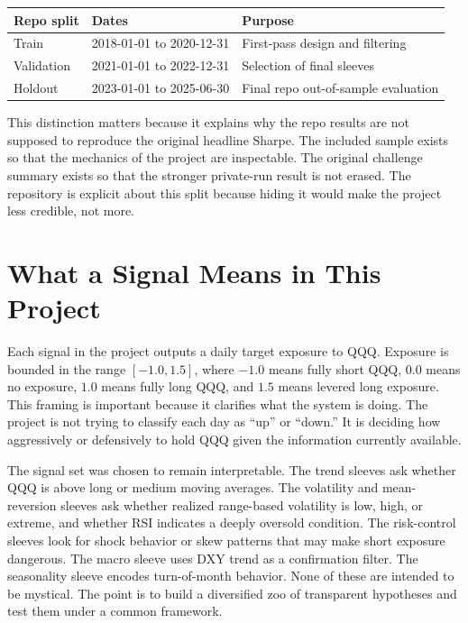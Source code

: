 \documentclass[11pt]{article}
\begin{document}
\begin{center}
\begin{tabular}{lll}
\toprule
\textbf{Repo split} & \textbf{Dates} & \textbf{Purpose} \\
\midrule
Train & 2018-01-01 to 2020-12-31 & First-pass design and filtering \\
Validation & 2021-01-01 to 2022-12-31 & Selection of final sleeves \\
Holdout & 2023-01-01 to 2025-06-30 & Final repo out-of-sample evaluation \\
\bottomrule
\end{tabular}
\end{center}

This distinction matters because it explains why the repo results are not
supposed to reproduce the original headline Sharpe. The included sample exists so
that the mechanics of the project are inspectable. The original challenge
summary exists so that the stronger private-run result is not erased. The
repository is explicit about this split because hiding it would make the project
less credible, not more.

\section*{What a Signal Means in This Project}

Each signal in the project outputs a daily target exposure to QQQ. Exposure is
bounded in the range \([-1.0, 1.5]\), where \(-1.0\) means fully short QQQ,
\(0.0\) means no exposure, \(1.0\) means fully long QQQ, and \(1.5\) means
levered long exposure. This framing is important because it clarifies what the
system is doing. The project is not trying to classify each day as ``up'' or
``down.'' It is deciding how aggressively or defensively to hold QQQ given the
information currently available.

The signal set was chosen to remain interpretable. The trend sleeves ask whether
QQQ is above long or medium moving averages. The volatility and mean-reversion
sleeves ask whether realized range-based volatility is low, high, or extreme,
and whether RSI indicates a deeply oversold condition. The risk-control sleeves
look for shock behavior or skew patterns that may make short exposure dangerous.
The macro sleeve uses DXY trend as a confirmation filter. The seasonality sleeve
encodes turn-of-month behavior. None of these are intended to be mystical. The
point is to build a diversified zoo of transparent hypotheses and test them
under a common framework.
\end{document}
